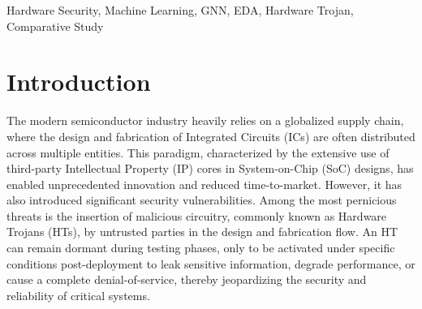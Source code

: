 \documentclass[conference]{IEEEtran}
\begin{document}
\maketitle

\begin{abstract}
Recent advancements in Machine Learning (ML), particularly Graph Neural Networks (GNNs), have shown significant potential for Hardware Trojan (HT) detection by identifying anomalous patterns in gate-level netlists. This approach eliminates the dependency on a "golden chip" and promises high accuracy. However, challenges such as severe class imbalance and the stealthy nature of Trojans remain. In this paper, we explore and compare four distinct GNN-based frameworks to address these challenges for the 2025 CAD Contest. The first method (Method A) employs a dual-model GraphSAGE system to perform classification at both circuit and gate levels. The second method (Method B) utilizes a dual-branch architecture, fusing node-level BiGCN features with subgraph-level MLP features. The third method (Method C) integrates a BiGCN with a custom Threshold-Aware Focal Loss to combat class imbalance. The fourth method (Method D) implements data augmentation through trojan insertion and employs a BiGCN with Weighted Focal Loss for improved detection. We present the architecture, feature engineering, and post-processing strategies for each method, culminating in a comparative analysis of their effectiveness.
\end{abstract}

\begin{IEEEkeywords}
Hardware Security, Machine Learning, GNN, EDA, Hardware Trojan, Comparative Study
\end{IEEEkeywords}


\section{Introduction}
\label{sec:introduction}
The modern semiconductor industry heavily relies on a globalized supply chain, where the design and fabrication of Integrated Circuits (ICs) are often distributed across multiple entities. This paradigm, characterized by the extensive use of third-party Intellectual Property (IP) cores in System-on-Chip (SoC) designs, has enabled unprecedented innovation and reduced time-to-market. However, it has also introduced significant security vulnerabilities. Among the most pernicious threats is the insertion of malicious circuitry, commonly known as Hardware Trojans (HTs), by untrusted parties in the design and fabrication flow. An HT can remain dormant during testing phases, only to be activated under specific conditions post-deployment to leak sensitive information, degrade performance, or cause a complete denial-of-service, thereby jeopardizing the security and reliability of critical systems.
\end{document}
